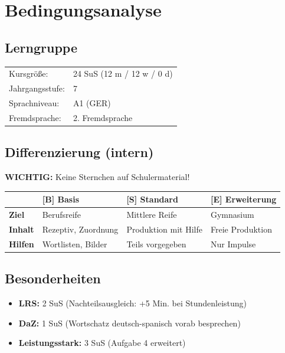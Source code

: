 \documentclass[11pt,a4paper]{article}
\newcommand{\jahrgangsstufe}{7}
\newcommand{\lerngruppengroesse}{24}
\newcommand{\maennlich}{12}
\newcommand{\weiblich}{12}
\newcommand{\divers}{0}
\newcommand{\gerniveau}{A1}
\begin{document}
\section{Bedingungsanalyse}

\subsection{Lerngruppe}
\begin{tabular}{ll}
    Kursgröße: & \lerngruppengroesse{} SuS (\maennlich{} m / \weiblich{} w / \divers{} d) \\
    Jahrgangsstufe: & \jahrgangsstufe \\
    Sprachniveau: & \gerniveau{} (GER) \\
    Fremdsprache: & 2. Fremdsprache \\
\end{tabular}

\subsection{Differenzierung (intern)}

\textbf{WICHTIG:} Keine Sternchen auf Schulermaterial!

\begin{tabular}{|l|p{4cm}|p{4cm}|p{4cm}|}
\hline
& \textbf{[B] Basis} & \textbf{[S] Standard} & \textbf{[E] Erweiterung} \\
\hline
\textbf{Ziel} & Berufsreife & Mittlere Reife & Gymnasium \\
\hline
\textbf{Inhalt} & Rezeptiv, Zuordnung & Produktion mit Hilfe & Freie Produktion \\
\hline
\textbf{Hilfen} & Wortlisten, Bilder & Teils vorgegeben & Nur Impulse \\
\hline
\end{tabular}

\subsection{Besonderheiten}
\begin{itemize}
    \item \textbf{LRS:} 2 SuS (Nachteilsausgleich: +5 Min. bei Stundenleistung)
    \item \textbf{DaZ:} 1 SuS (Wortschatz deutsch-spanisch vorab besprechen)
    \item \textbf{Leistungsstark:} 3 SuS (Aufgabe 4 erweitert)
\end{itemize}
\end{document}
